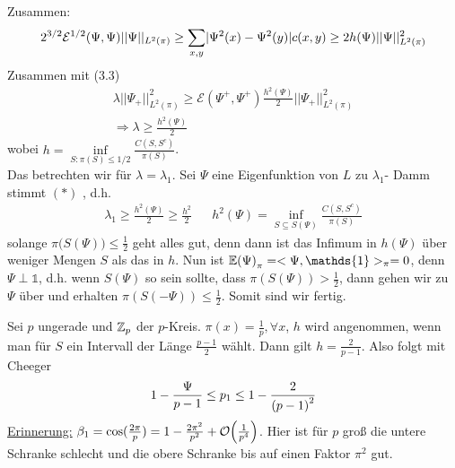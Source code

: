 \begin{beweis}
	Zusammen: 
	\begin{align}
		2^{3/2} \mathcal{E}^{1/2}(\Psi,\Psi) || \Psi ||_{L^2(\pi)} \geq \sum\limits_{x,y} \lvert\Psi^2(x) - \Psi^2(y)\rvert c(x,y) \geq 2 h(\Psi) || \Psi||^2_{L^2(\pi)}
	\end{align}
	Zusammen mit (3.3) 
	\begin{gather}
		\lambda || \Psi_+ ||^2_{L^2(\pi)} \geq \mathcal{E}(\Psi^+,\Psi^+) \frac{h^2(\Psi)}{2} ||\Psi_+||^2_{L^2(\pi)} \\
		\Rightarrow \lambda \geq \frac{h^2(\Psi)}{2}
	\end{gather}	
	wobei $h = \inf\limits_{S: \pi(S) \leq 1/2} \frac{C(S,S^c)}{\pi(S)}$. \\
	Das betrechten wir für $\lambda = \lambda_1$. Sei $\Psi$ eine Eigenfunktion von $L$ zu $\lambda_1$- Damm stimmt $(*)$ , d.h. 
	\begin{align}
		\lambda_1 \geq \frac{h^2(\Psi)}{2} \geq \frac{h^2}{2} && h^2(\Psi) = \inf\limits_{S \subseteq S(\Psi)} \frac{C(S,S^c)}{\pi(S)}
	\end{align}
	solange $\pi\Big(S(\Psi)\Big) \leq \frac{1}{2}$ geht alles gut, denn dann ist das Infimum in $h(\Psi)$ über weniger Mengen $S$ als das in $h$. Nun ist $\EW{\Psi}_{\pi} = <\Psi, \mathds{1}>_{\pi} = 0$, denn $\Psi \perp \mathds{1}$, d.h. wenn $S(\Psi)$ so sein sollte, dass $\pi(S(\Psi)) > \frac{1}{2}$, dann gehen wir zu $\Psi$ über und erhalten $\pi(S(-\Psi)) \leq \frac{1}{2}$. Somit sind wir fertig.
\end{beweis}
\begin{beispiel}%
	Sei $p$ ungerade und $\mathbb{Z}_p$ der $p$-Kreis. $\pi(x) = \frac{1}{p}, \forall x$, $h$ wird angenommen, wenn man für $S$ ein Intervall der Länge $\frac{p-1}{2}$ wählt. Dann gilt $h = \frac{2}{p-1}$. Also folgt mit Cheeger 
	\begin{align}
	1 - \frac{\Psi}{p-1} \leq p_1 \leq 1 - \frac{2}{\left(p-1\right)^2}
	\end{align}
	\underline{Erinnerung:} $\beta_1 = \cos(\frac{2\pi}{p}) = 1 - \frac{2\pi^2}{p^2} + \mathcal{O}\enb{\frac{1}{p^4}}$. Hier ist für $p$ groß die untere Schranke schlecht und die obere Schranke bis auf einen Faktor $\pi^2$ gut.
\end{beispiel}

